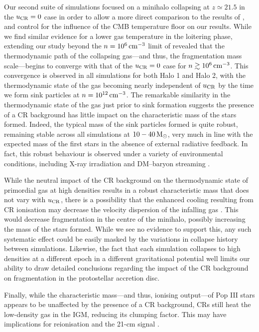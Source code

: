 \documentclass[usenatbib]{mn2e}
\newcommand{\cc}{\,{\rm cm}^{-3}}
\newcommand{\msun}{\,{\rm M}_{\odot}}
\newcommand{\ucr}{{u}_{\rm \small CR}}
\begin{document}
Our second suite of simulations focused on a minihalo collapsing at $z\simeq21.5$ in the $\ucr=0$ case in order to allow a more direct comparison to the results of \citet{StacyBromm2007}, and control for the influence of the CMB temperature floor on our results.
While we find similar evidence for a lower gas temperature in the loitering phase, extending our study beyond the $n=10^6\cc$ limit of \citet{StacyBromm2007} revealed that the thermodynamic path of the collapsing gas---and thus, the fragmentation mass scale---begins to converge with that of the $\ucr=0$ case for $n\gtrsim10^6\cc$.  
This convergence is observed in all simulations for both Halo 1 and Halo 2, with the thermodynamic state of the gas becoming nearly independent of $\ucr$ by the time we form sink particles at $n=10^{12}\cc$.
The remarkable similarity in the thermodynamic state of the gas just prior to sink formation suggests the presence of a CR background has little impact on the characteristic mass of the stars formed.  
Indeed, the typical mass of the sink particles formed is quite robust, remaining stable across all simulations at $10-40\msun$, very much in line with the expected mass of the first stars in the absence of external radiative feedback. In fact, this robust behaviour is observed under a variety of environmental conditions, including X-ray irradiation \citep{Hummeletal2015} and DM--baryon streaming \citep{StacyBrommLoeb2011a,Greifetal2011b}.

While the neutral impact of the CR background on the thermodynamic state of primordial gas at high densities results in a robust characteristic mass that does not vary with $\ucr$, there is a possibility that the enhanced cooling resulting from CR ionisation may decrease the velocity dispersion of the infalling gas \citep{Clarketal2011a}.  
This would decrease fragmentation in the centre of the minihalo, possibly increasing the mass of the stars formed.
While we see no evidence to support this, any such systematic effect could be easily masked by the variations in collapse history between simulations.  
Likewise, the fact that each simulation collapses to high densities at a different epoch in a different gravitational potential well limits our ability to draw detailed conclusions regarding the impact of the CR background on fragmentation in the protostellar accretion disc.

Finally, while the characteristic mass---and thus, ionising output---of Pop III stars appears to be unaffected by the presence of a CR background, CRs still heat the low-density gas in the IGM, reducing its clumping factor. This may have implications for reionisation and the 21-cm signal \citep{FurlanettoPengBriggs2006, SazonovSunyaev2015}.
\end{document}
